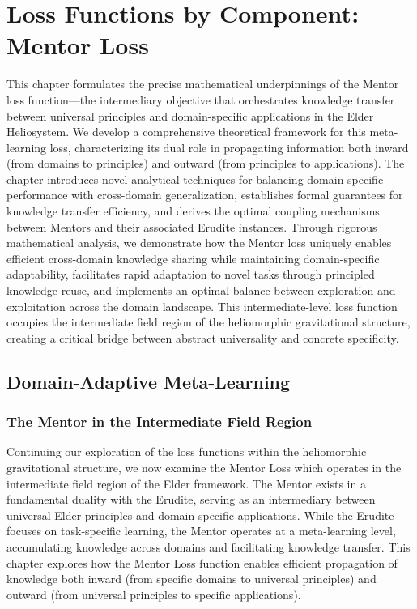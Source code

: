 \chapter{Loss Functions by Component: Mentor Loss}

\begin{tcolorbox}[colback=blue!5!white,colframe=blue!75!black,title=Chapter Summary]
This chapter formulates the precise mathematical underpinnings of the Mentor loss function—the intermediary objective that orchestrates knowledge transfer between universal principles and domain-specific applications in the Elder Heliosystem. We develop a comprehensive theoretical framework for this meta-learning loss, characterizing its dual role in propagating information both inward (from domains to principles) and outward (from principles to applications). The chapter introduces novel analytical techniques for balancing domain-specific performance with cross-domain generalization, establishes formal guarantees for knowledge transfer efficiency, and derives the optimal coupling mechanisms between Mentors and their associated Erudite instances. Through rigorous mathematical analysis, we demonstrate how the Mentor loss uniquely enables efficient cross-domain knowledge sharing while maintaining domain-specific adaptability, facilitates rapid adaptation to novel tasks through principled knowledge reuse, and implements an optimal balance between exploration and exploitation across the domain landscape. This intermediate-level loss function occupies the intermediate field region of the heliomorphic gravitational structure, creating a critical bridge between abstract universality and concrete specificity.
\end{tcolorbox}

\section{Domain-Adaptive Meta-Learning}

\subsection{The Mentor in the Intermediate Field Region}

Continuing our exploration of the loss functions within the heliomorphic gravitational structure, we now examine the Mentor Loss which operates in the intermediate field region of the Elder framework. The Mentor exists in a fundamental duality with the Erudite, serving as an intermediary between universal Elder principles and domain-specific applications. While the Erudite focuses on task-specific learning, the Mentor operates at a meta-learning level, accumulating knowledge across domains and facilitating knowledge transfer. This chapter explores how the Mentor Loss function enables efficient propagation of knowledge both inward (from specific domains to universal principles) and outward (from universal principles to specific applications).

